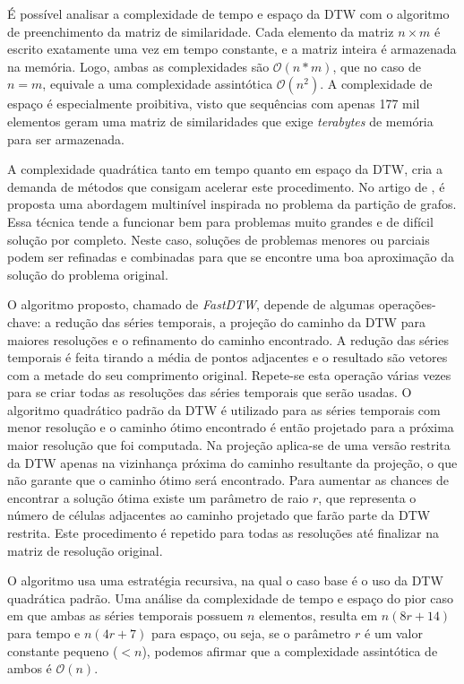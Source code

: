 É possível analisar a complexidade de tempo e espaço da DTW com o algoritmo de preenchimento da matriz de similaridade. Cada elemento da matriz $n \times m$ é escrito exatamente uma vez em tempo constante, e a matriz inteira é armazenada na memória. Logo, ambas as complexidades são $\mathcal{O}(n * m)$, que no caso de $n = m$, equivale a uma complexidade assintótica $\mathcal{O}(n^2)$. A complexidade de espaço é especialmente proibitiva, visto que sequências com apenas 177 mil elementos geram uma matriz de similaridades que exige \textit{terabytes} de memória para ser armazenada.

A complexidade quadrática tanto em tempo quanto em espaço da DTW, cria a demanda de métodos que consigam acelerar este procedimento. No artigo de \citet{salvador2007toward}, é proposta uma abordagem multinível inspirada no problema da partição de grafos. Essa técnica tende a funcionar bem para problemas muito grandes e de difícil solução por completo. Neste caso, soluções de problemas menores ou parciais podem ser refinadas e combinadas para que se encontre uma boa aproximação da solução do problema original.

O algoritmo proposto, chamado de \textit{FastDTW}, depende de algumas operações-chave: a redução das séries temporais, a projeção do caminho da DTW para maiores resoluções e o refinamento do caminho encontrado. A redução das séries temporais é feita tirando a média de pontos adjacentes e o resultado são vetores com a metade do seu comprimento original. Repete-se esta operação várias vezes para se criar todas as resoluções das séries temporais que serão usadas. O algoritmo quadrático padrão da DTW é utilizado para as séries temporais com menor resolução e o caminho ótimo encontrado é então projetado para a próxima maior resolução que foi computada. Na projeção aplica-se de uma versão restrita da DTW apenas na vizinhança próxima do caminho resultante da projeção, o que não garante que o caminho ótimo será encontrado. Para aumentar as chances de encontrar a solução ótima existe um parâmetro de raio $r$, que representa o número de células adjacentes ao caminho projetado que farão parte da DTW restrita. Este procedimento é repetido para todas as resoluções até finalizar na matriz de resolução original.

O algoritmo usa uma estratégia recursiva, na qual o caso base é o uso da DTW quadrática padrão. Uma análise da complexidade de tempo e espaço do pior caso em que ambas as séries temporais possuem $n$ elementos, resulta em $n(8r + 14)$ para tempo e $n(4r + 7)$ para espaço, ou seja, se o parâmetro $r$ é um valor constante pequeno ($<n$), podemos afirmar que a complexidade assintótica de ambos é $\mathcal{O}(n)$.


